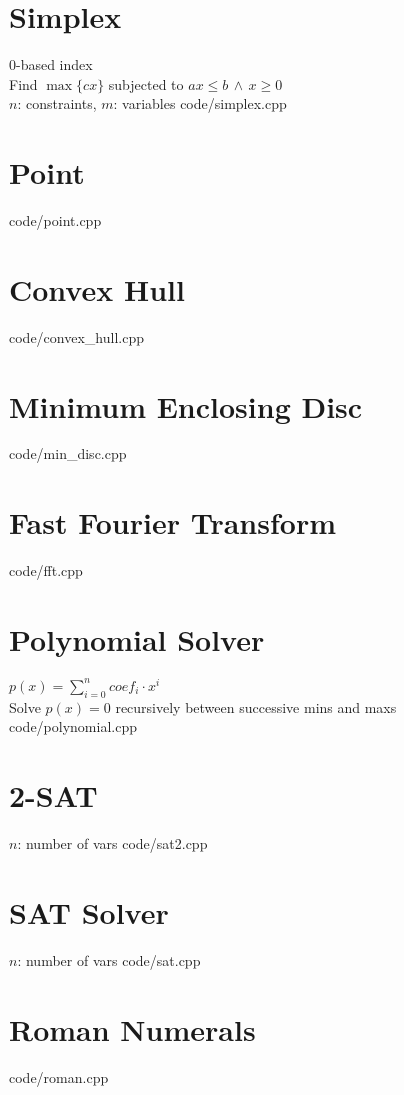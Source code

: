 \documentclass [landscape,8pt,a4paper,twocolumn]{article}
\begin{document}
\section{Simplex}
0-based index \\
Find $ \max\{cx\} $ subjected to $ ax \leq b \, \wedge \, x \geq 0 $ \\
$ n $: constraints, $ m $: variables
 {code/simplex.cpp}

\section{Point}
 {code/point.cpp}

\section{Convex Hull}
 {code/convex_hull.cpp}

\section{Minimum Enclosing Disc}
 {code/min_disc.cpp}

\section{Fast Fourier Transform}
 {code/fft.cpp}

\section{Polynomial Solver}
$ p(x)=\sum_{i=0}^{n} coef_i \cdot x^i $ \\
Solve $ p(x)=0 $ recursively between successive mins and maxs
 {code/polynomial.cpp}

\section{2-SAT}
$ n $: number of vars
 {code/sat2.cpp}

\section{SAT Solver}
$ n $: number of vars
 {code/sat.cpp}

\section{Roman Numerals}
 {code/roman.cpp}
\end{document}

